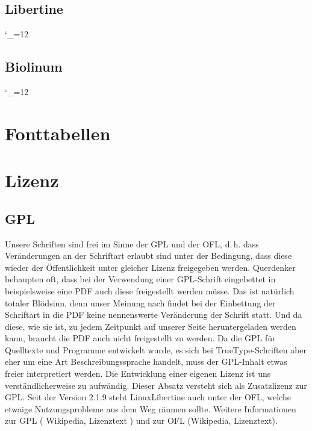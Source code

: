 \documentclass{fontdokuold}
\begin{document}
\section{Libertine}
\setlength{\columnsep}{1cm}
\begin{multicols}{2}
{\catcode`\_=12

}
\end{multicols}

\newpage
\section{Biolinum}
\setlength{\columnsep}{1cm}
\begin{multicols}{2}
{\catcode`\_=12

}
\end{multicols}


\chapter{Fonttabellen}

\newcommand{\printFDFont}[1]{\InputIfFileExists{#1.inc}{}{}}
\let\myfdentry=\PrintTableFontShape%



\chapter{Lizenz}

\section{GPL}

Unsere Schriften sind frei im Sinne der GPL und der OFL, d.\,h. dass
Veränderungen an der Schriftart erlaubt sind unter der Bedingung, dass diese
wieder der Öffentlichkeit unter gleicher Lizenz freigegeben werden. Querdenker
behaupten oft, dass bei der Verwendung einer GPL-Schrift eingebettet in
beispielsweise eine PDF auch diese freigestellt werden müsse. Das ist natürlich
totaler Blödsinn, denn unser Meinung nach findet bei der Einbettung der
Schriftart in die PDF keine nennenswerte Veränderung der Schrift statt. Und da
diese, wie sie ist, zu jedem Zeitpunkt auf unserer Seite heruntergeladen werden
kann, braucht die PDF auch nicht freigestellt zu werden. Da die GPL für
Quelltexte und Programme entwickelt wurde, es sich bei TrueType-Schriften aber
eher um eine Art Beschreibungssprache handelt, muss der GPL-Inhalt etwas freier
interpretiert werden. Die Entwicklung einer eigenen Lizenz ist uns
verständlicherweise zu aufwändig. Dieser Absatz versteht sich als Zusatzlizenz
zur GPL. Seit der Version 2.1.9 steht LinuxLibertine auch unter der OFL, welche
etwaige Nutzungsprobleme aus dem Weg räumen sollte. Weitere Informationen zur
GPL ( Wikipedia, Lizenztext ) und zur OFL (Wikipedia, Lizenztext).
\end{document}
